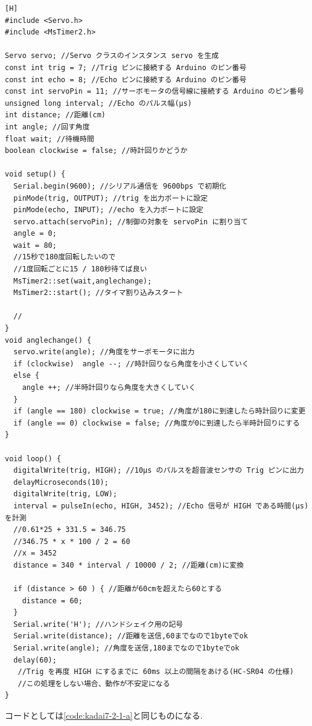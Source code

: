 \documentclass{jarticle}
\begin{document}
\begin{lstlisting}[caption = 課題7.2.2(Arduino),label=code:kadai7-2-2-a][H]
#include <Servo.h>
#include <MsTimer2.h>

Servo servo; //Servo クラスのインスタンス servo を生成
const int trig = 7; //Trig ピンに接続する Arduino のピン番号
const int echo = 8; //Echo ピンに接続する Arduino のピン番号
const int servoPin = 11; //サーボモータの信号線に接続する Arduino のピン番号
unsigned long interval; //Echo のパルス幅(μs)
int distance; //距離(cm)
int angle; //回す角度
float wait; //待機時間
boolean clockwise = false; //時計回りかどうか

void setup() {
  Serial.begin(9600); //シリアル通信を 9600bps で初期化
  pinMode(trig, OUTPUT); //trig を出力ポートに設定
  pinMode(echo, INPUT); //echo を入力ポートに設定
  servo.attach(servoPin); //制御の対象を servoPin に割り当て
  angle = 0;
  wait = 80;
  //15秒で180度回転したいので
  //1度回転ごとに15 / 180秒待てば良い
  MsTimer2::set(wait,anglechange);
  MsTimer2::start(); //タイマ割り込みスタート

  // 
}
void anglechange() {
  servo.write(angle); //角度をサーボモータに出力
  if (clockwise)  angle --; //時計回りなら角度を小さくしていく
  else {
    angle ++; //半時計回りなら角度を大きくしていく
  }
  if (angle == 180) clockwise = true; //角度が180に到達したら時計回りに変更
  if (angle == 0) clockwise = false; //角度が0に到達したら半時計回りにする
}

void loop() {
  digitalWrite(trig, HIGH); //10μs のパルスを超音波センサの Trig ピンに出力
  delayMicroseconds(10);
  digitalWrite(trig, LOW);
  interval = pulseIn(echo, HIGH, 3452); //Echo 信号が HIGH である時間(μs)を計測
  //0.61*25 + 331.5 = 346.75
  //346.75 * x * 100 / 2 = 60
  //x = 3452
  distance = 340 * interval / 10000 / 2; //距離(cm)に変換
  
  if (distance > 60 ) { //距離が60cmを超えたら60とする
    distance = 60;
  } 
  Serial.write('H'); //ハンドシェイク用の記号
  Serial.write(distance); //距離を送信,60までなので1byteでok
  Serial.write(angle); //角度を送信,180までなので1byteでok
  delay(60);
   //Trig を再度 HIGH にするまでに 60ms 以上の間隔をあける(HC-SR04 の仕様)
   //この処理をしない場合、動作が不安定になる
}
\end{lstlisting}

コードとしては\ref{code:kadai7-2-1-a}と同じものになる.
\end{document}
